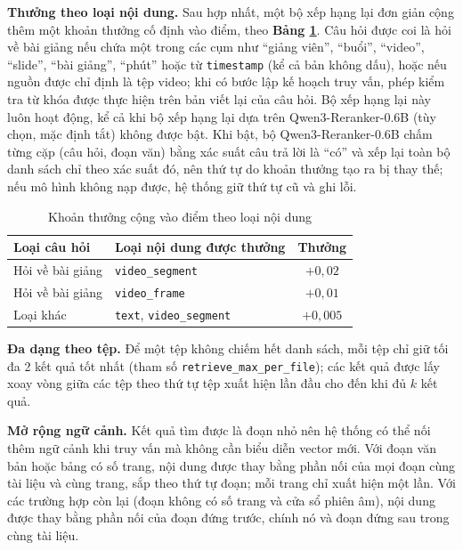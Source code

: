 \bigbreak\noindent
\textbf{Thưởng theo loại nội dung.} Sau hợp nhất, một bộ xếp hạng lại đơn giản cộng thêm một khoản thưởng cố định vào điểm, theo \textbf{Bảng \ref{tab:type-prior}}. Câu hỏi được coi là hỏi về bài giảng nếu chứa một trong các cụm như ``giảng viên'', ``buổi'', ``video'', ``slide'', ``bài giảng'', ``phút'' hoặc từ \texttt{timestamp} (kể cả bản không dấu), hoặc nếu nguồn được chỉ định là tệp video; khi có bước lập kế hoạch truy vấn, phép kiểm tra từ khóa được thực hiện trên bản viết lại của câu hỏi. Bộ xếp hạng lại này luôn hoạt động, kể cả khi bộ xếp hạng lại dựa trên Qwen3-Reranker-0.6B (tùy chọn, mặc định tắt) không được bật. Khi bật, bộ Qwen3-Reranker-0.6B chấm từng cặp (câu hỏi, đoạn văn) bằng xác suất câu trả lời là ``có'' và xếp lại toàn bộ danh sách chỉ theo xác suất đó, nên thứ tự do khoản thưởng tạo ra bị thay thế; nếu mô hình không nạp được, hệ thống giữ thứ tự cũ và ghi lỗi.

\begin{table}[ht]
    \centering
    \caption{Khoản thưởng cộng vào điểm theo loại nội dung}
    \label{tab:type-prior}
    \begin{tabular}{|l|l|c|}
    \hline
    \textbf{Loại câu hỏi} & \textbf{Loại nội dung được thưởng} & \textbf{Thưởng} \\
    \hline
    Hỏi về bài giảng & \texttt{video\_segment} & $+0{,}02$ \\
    \hline
    Hỏi về bài giảng & \texttt{video\_frame} & $+0{,}01$ \\
    \hline
    Loại khác & \texttt{text}, \texttt{video\_segment} & $+0{,}005$ \\
    \hline
    \end{tabular}
\end{table}

\bigbreak\noindent
\textbf{Đa dạng theo tệp.} Để một tệp không chiếm hết danh sách, mỗi tệp chỉ giữ tối đa 2 kết quả tốt nhất (tham số \texttt{retrieve\_max\_per\_file}); các kết quả được lấy xoay vòng giữa các tệp theo thứ tự tệp xuất hiện lần đầu cho đến khi đủ $k$ kết quả.

\bigbreak\noindent
\textbf{Mở rộng ngữ cảnh.} Kết quả tìm được là đoạn nhỏ nên hệ thống có thể nối thêm ngữ cảnh khi truy vấn mà không cần biểu diễn vector mới. Với đoạn văn bản hoặc bảng có số trang, nội dung được thay bằng phần nối của mọi đoạn cùng tài liệu và cùng trang, sắp theo thứ tự đoạn; mỗi trang chỉ xuất hiện một lần. Với các trường hợp còn lại (đoạn không có số trang và cửa sổ phiên âm), nội dung được thay bằng phần nối của đoạn đứng trước, chính nó và đoạn đứng sau trong cùng tài liệu.

